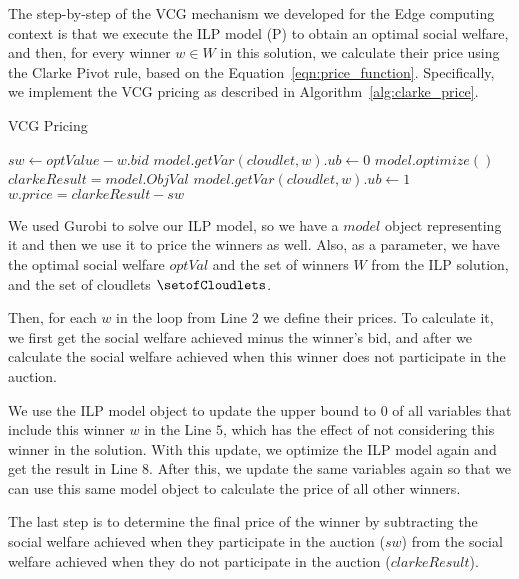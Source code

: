 \documentclass[English]{ic-tese-v3}
\begin{document}
The step-by-step of the VCG mechanism we developed for the Edge computing context is that we execute the ILP model (P) to obtain an optimal social welfare, and then, for every winner $w \in W$ in this solution, we calculate their price using the Clarke Pivot rule, based on the Equation~\eqref{eqn:price_function}. Specifically, we implement the VCG pricing as described in Algorithm~\ref{alg:clarke_price}.
\begin{algorithm}[H]
    \caption{VCG Pricing}\label{alg:clarke_price}
    {\fontsize{9}{9}\selectfont
        \begin{algorithmic}[1]
                \State $sw \gets optValue - w.bid$
                \For{$\cloudlet \in \setofCloudlets$}
                    \State $model.getVar(cloudlet, w).ub \gets 0$
                \EndFor
                \State $model.optimize()$
                \State $clarkeResult = model.ObjVal$
                \For{$\cloudlet \in \setofCloudlets$}
                    \State $model.getVar(cloudlet, w).ub \gets 1$
                \EndFor
                \State $w.price = clarkeResult - sw$
            \EndFor
        \EndFunction
    \end{algorithmic}}
\end{algorithm}
We used Gurobi to solve our ILP model, so we have a $model$ object representing it and then we use it to price the winners as well. Also, as a parameter, we have the optimal social welfare $optVal$ and the set of winners $W$ from the ILP solution, and the set of cloudlets $\setofCloudlets$.

Then, for each $w$ in the loop from Line $2$ we define their prices. To calculate it, we first get the social welfare achieved minus the winner's bid, and after we calculate the social welfare achieved when this winner does not participate in the auction. 

We use the ILP model object to update the upper bound to $0$ of all variables that include this winner $w$ in the Line $5$, which has the effect of not considering this winner in the solution. With this update, we optimize the ILP model again and get the result in Line $8$. After this, we update the same variables again so that we can use this same model object to calculate the price of all other winners.

The last step is to determine the final price of the winner by subtracting the social welfare achieved when they participate in the auction ($sw$) from the social welfare achieved when they do not participate in the auction ($clarkeResult$).
\end{document}
